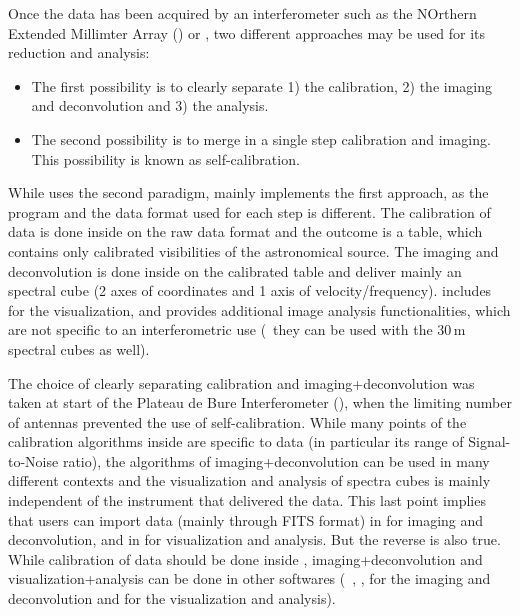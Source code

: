 Once the data has been acquired by an interferometer such as the 
NOrthern Extended Millimter Array  
(\NOEMA{}) or \ALMA{}, two different approaches may
be used for its reduction and analysis:
\begin{itemize}
\item The first possibility is to clearly separate 1) the calibration, 2)
  the imaging and deconvolution and 3) the analysis.
\item The second possibility is to merge in a single step calibration and
  imaging. This possibility is known as self-calibration.
\end{itemize}
While \casa{} uses the second paradigm, \gildas{} mainly implements 
the first approach, as the program and the data format used 
for each step is different. The calibration of \NOEMA{} data is
done inside \clic{} on the \NOEMA{} raw data format and the outcome is a
\uv{} table, which contains only calibrated visibilities of the
astronomical source.  The imaging and deconvolution is done inside
\imager{} on the calibrated \uv{} table and deliver mainly an \lmv{}
spectral cube (2 axes of coordinates and 1 axis of velocity/frequency).
\imager{} includes \greg{} for the  visualization, and provides additional
image analysis functionalities,  which are not specific to an interferometric use 
(\eg\ they can be used with the \IRAM{} 30\,m spectral cubes as well).

The choice of clearly separating calibration and imaging+deconvolution was
taken at start of the Plateau de Bure Interferometer (\PdBI{}), 
when the limiting number of antennas prevented 
the use of self-calibration. 
While many points of the calibration algorithms
inside \clic{} are specific to \NOEMA{} data (in particular its range of
Signal-to-Noise ratio), the algorithms of imaging+deconvolution can be used
in many different contexts and the visualization and analysis of spectra
cubes is mainly independent of the instrument that delivered the data. 
This last point implies that users can import data (mainly through FITS format)
in \imager{} for imaging and deconvolution, and in \greg{} for
visualization and analysis. But the reverse is also true. While calibration
of \NOEMA{} data should be done inside \clic{}, imaging+deconvolution and
visualization+analysis can be done in other softwares (\eg\ \miriad{},
\aips{}, \casa{} for the imaging and deconvolution
and \karma{} for the visualization and analysis).

